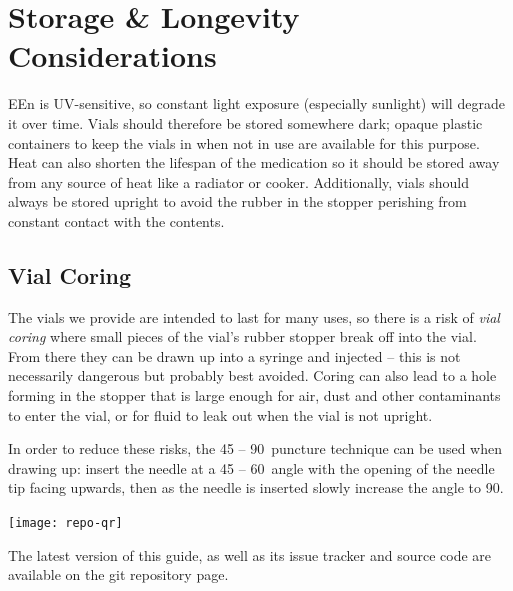 \documentclass[twoside,a5paper]{article}
\begin{document}
\section{Storage \& Longevity Considerations}

EEn is UV-sensitive, so constant light exposure (especially sunlight)
will degrade it over time.  Vials should therefore be stored somewhere
dark; opaque plastic containers to keep the vials in when not in use
are available for this purpose.  Heat can also shorten the lifespan of
the medication so it should be stored away from any source of heat
like a radiator or cooker.  Additionally, vials should always be
stored upright to avoid the rubber in the stopper perishing from
constant contact with the contents.

\subsection{Vial Coring}

The vials we provide are intended to last for many uses, so there is a
risk of \textit{vial coring} where small pieces of the vial's rubber
stopper break off into the vial.  From there they can be drawn up into
a syringe and injected -- this is not necessarily dangerous but
probably best avoided.  Coring can also lead to a hole forming in the
stopper that is large enough for air, dust and other contaminants to
enter the vial, or for fluid to leak out when the vial is not upright.

In order to reduce these risks, the 45 -- 90\textdegree\ puncture
technique can be used when drawing up: insert the needle at a 45 --
60\textdegree\ angle with the opening of the needle tip facing
upwards, then as the needle is inserted slowly increase the angle to
90\textdegree.

\cleardoublepage

\pagestyle{empty}
\begin{center}
  \null\vfill
  \texttt{[image: repo-qr]} \\
  \vspace{1.2em}
  \parbox{0.8\textwidth}{
    \small
    The latest version of this guide, as well as its issue tracker and
    source code are available on the git repository page.
  }
  \vfill
\end{center}
\end{document}
